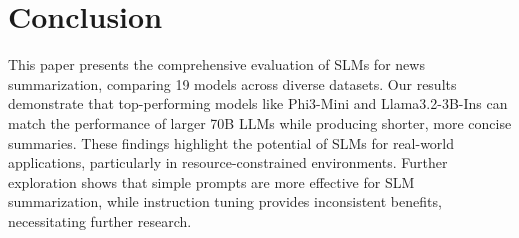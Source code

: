 


\section{Conclusion}
\label{sec:conclusion}
This paper presents the comprehensive evaluation of SLMs for news summarization, comparing 19 models across diverse datasets. Our results demonstrate that top-performing models like Phi3-Mini and Llama3.2-3B-Ins can match the performance of larger 70B LLMs while producing shorter, more concise summaries. These findings highlight the potential of SLMs for real-world applications, particularly in resource-constrained environments. Further exploration shows that simple prompts are more effective for SLM summarization, while instruction tuning provides inconsistent benefits, necessitating further research.




